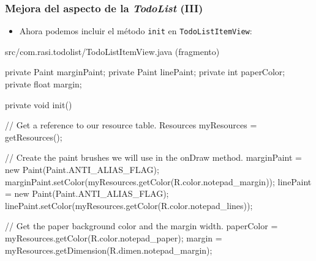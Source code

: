 \documentclass[hyperref={pdfpagelabels=true},ucs]{beamer}
\begin{document}
\begin{frame}[fragile]
\frametitle{Mejora del aspecto de la \emph{TodoList} (III)}

\begin{itemize}
\item Ahora podemos incluir el método \verb|init| en
  \verb|TodoListItemView|:
\end{itemize}

\begin{tiny}
\begin{block}{src/com.rasi.todolist/TodoListItemView.java (fragmento)}
\begin{java}
private Paint marginPaint;
private Paint linePaint;
private int paperColor;
private float margin;

private void init() {
  // Get a reference to our resource table.
  Resources myResources = getResources();

  // Create the paint brushes we will use in the onDraw method.
  marginPaint = new Paint(Paint.ANTI_ALIAS_FLAG);
  marginPaint.setColor(myResources.getColor(R.color.notepad_margin));
  linePaint = new Paint(Paint.ANTI_ALIAS_FLAG);
  linePaint.setColor(myResources.getColor(R.color.notepad_lines));

  // Get the paper background color and the margin width.
  paperColor = myResources.getColor(R.color.notepad_paper);
  margin = myResources.getDimension(R.dimen.notepad_margin);
}
\end{java}
\end{block}
\end{tiny}


\end{frame}
\end{document}
